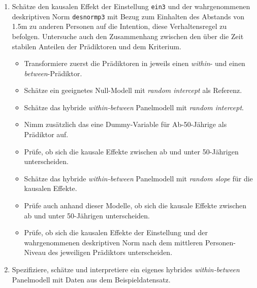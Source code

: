 \documentclass[
]{book}
\providecommand{\tightlist}{%
  \setlength{\itemsep}{0pt}\setlength{\parskip}{0pt}}
\begin{document}
\begin{enumerate}
\def\labelenumi{\arabic{enumi})}
\tightlist
\item
  Schätze den kausalen Effekt der Einstellung \texttt{ein3} und der wahrgenommenen deskriptiven Norm \texttt{desnormp3} mit Bezug zum Einhalten des Abstands von 1.5m zu anderen Personen auf die Intention, diese Verhaltensregel zu befolgen. Untersuche auch den Zusammenhang zwischen den über die Zeit stabilen Anteilen der Prädiktoren und dem Kriterium.

  \begin{itemize}
  \tightlist
  \item
    Transformiere zuerst die Prädiktoren in jeweils einen \emph{within}- und einen \emph{between}-Prädiktor.
  \item
    Schätze ein geeignetes Null-Modell mit \emph{random intercept} als Referenz.
  \item
    Schätze das hybride \emph{within-between} Panelmodell mit \emph{random intercept}.
  \item
    Nimm zusätzlich das eine Dummy-Variable für Ab-50-Jährige als Prädiktor auf.
  \item
    Prüfe, ob sich die kausale Effekte zwischen ab und unter 50-Jährigen unterscheiden.
  \item
    Schätze das hybride \emph{within-between} Panelmodell mit \emph{random slope} für die kausalen Effekte.
  \item
    Prüfe auch anhand dieser Modelle, ob sich die kausale Effekte zwischen ab und unter 50-Jährigen unterscheiden.
  \item
    Prüfe, ob sich die kausalen Effekte der Einstellung und der wahrgenommenen deskriptiven Norm nach dem mittleren Personen-Niveau des jeweiligen Prädiktors unterscheiden.
  \end{itemize}
\item
  Spezifiziere, schätze und interpretiere ein eigenes hybrides \emph{within-between} Panelmodell mit Daten aus dem Beispieldatensatz.
\end{enumerate}

  
\end{document}
